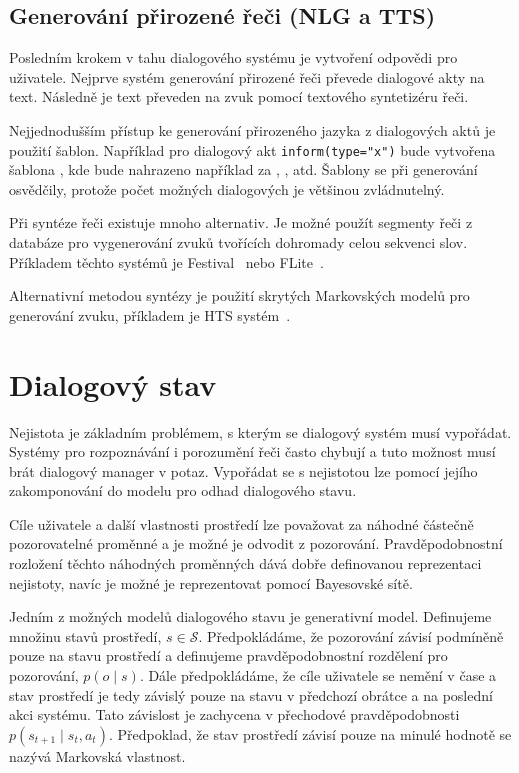 \subsection{Generování přirozené řeči (NLG a TTS)}

Posledním krokem v tahu dialogového systému je vytvoření odpovědi pro uživatele.
Nejprve systém generování přirozené řeči převede dialogové akty na text.
Následně je text převeden na zvuk pomocí textového syntetizéru řeči.

Nejjednodušším přístup ke generování přirozeného jazyka z dialogových aktů je použití šablon.
Například pro dialogový akt {\tt inform(type="x")} bude vytvořena šablona , kde  bude nahrazeno například za , , atd.
Šablony se při generování osvědčily, protože počet možných dialogových je většinou zvládnutelný.

Při syntéze řeči existuje mnoho alternativ.
Je možné použít segmenty řeči z databáze pro vygenerování zvuků tvořících dohromady celou sekvenci slov.
Příkladem těchto systémů je Festival~\cite{black2001festival} nebo FLite~\cite{black2001flite}.

Alternativní metodou syntézy je použití skrytých Markovských modelů pro generování zvuku, příkladem je HTS systém~\cite{zen2007hmm}.

\section{Dialogový stav}

Nejistota je základním problémem, s kterým se dialogový systém musí vypořádat.
Systémy pro rozpoznávání i porozumění řeči často chybují a tuto možnost musí brát dialogový manager v potaz.
Vypořádat se s nejistotou lze pomocí jejího zakomponování do modelu pro odhad dialogového stavu.

Cíle uživatele a další vlastnosti prostředí lze považovat za náhodné částečně pozorovatelné proměnné a je možné je odvodit z pozorování.
Pravděpodobnostní rozložení těchto náhodných proměnných dává dobře definovanou reprezentaci nejistoty, navíc je možné je reprezentovat pomocí Bayesovské sítě.

Jedním z možných modelů dialogového stavu je generativní model.
Definujeme množinu stavů prostředí, $s \in \mathcal{S}$.
Předpokládáme, že pozorování závisí podmíněně pouze na stavu prostředí a definujeme pravděpodobnostní rozdělení pro pozorování, $p(o \mid s)$.
Dále předpokládáme, že cíle uživatele se nemění v čase a stav prostředí je tedy závislý pouze na stavu v předchozí obrátce a na poslední akci systému.
Tato závislost je zachycena v přechodové pravděpodobnosti $p(s_{t+1} \mid s_t, a_t)$.
Předpoklad, že stav prostředí závisí pouze na minulé hodnotě se nazývá Markovská vlastnost.

